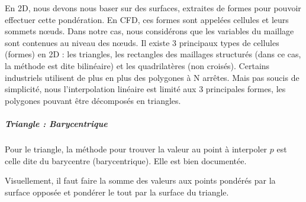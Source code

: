En 2D, nous devons nous baser sur des surfaces, extraites de formes pour pouvoir effectuer cette pondération. En CFD, ces formes sont appelées cellules et leurs sommets nœuds. Dans notre cas, nous considérons que les variables du maillage sont contenues au niveau des nœuds. 
Il existe 3 principaux types de cellules (formes) en 2D : les triangles, les rectangles des maillages structurés (dans ce cas, la méthode est dite bilinéaire) et les quadrilatères (non croisés).
Certains industriels utilisent de plus en plus des polygones à N arrêtes. Mais pas soucis de simplicité, nous l'interpolation linéaire est limité aux 3 principales formes, les polygones pouvant être décomposés en triangles. %

\subparagraph{Triangle : Barycentrique}

Pour le triangle, la méthode pour trouver la valeur au point à interpoler \( p \) est celle dite du barycentre (barycentrique).
Elle est bien documentée.

Visuellement, il faut faire la somme des valeurs aux points pondérés par la surface opposée et pondérer le tout par la surface du triangle.

